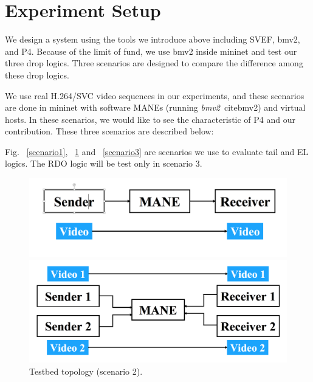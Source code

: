 
\section{Experiment Setup} \label{sec:setup}

We design a system using the tools we introduce above including SVEF, bmv2, and P4. Because of the limit of fund, we use bmv2 inside mininet and test our three drop logics. Three scenarios are designed to compare the difference among these drop logics. 

We use real H.264/SVC video sequences in our experiments, and these scenarios are done in mininet with software MANEs (running {\em bmv2}~cite{bmv2}) and virtual hosts.
In these scenarios, we would like to see the characteristic of P4 and our contribution. These three scenarios are described below:

Fig. ~\ref{scenario1}, ~\ref{scenario2} and ~\ref{scenario3} are scenarios we use to evaluate tail and EL logics. The RDO logic will be test only in scenario 3.

\begin{figure}[tbh]
	\centering
	\begin{minipage}[t]{0.24\textwidth}
	\centering
	\includegraphics[width=\textwidth]{fig/scenario1.png}
	\caption{Testbed topology (scenarios 1).}
	\label{scenario1} 
	\end{minipage}
	\hfill\begin{minipage}[t]{0.23\textwidth}
	\centering
	\includegraphics[width=\textwidth]{fig/scenario2.png}
	\caption{Testbed topology (scenario 2).}
	\label{scenario2} 
	\end{minipage}
	\vspace{-0.1cm}
\end{figure}

